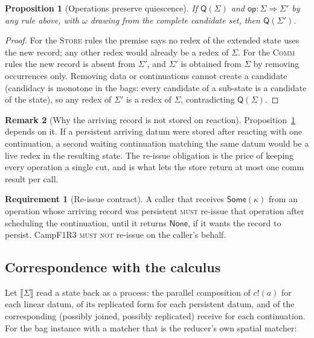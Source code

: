 \documentclass[11pt]{article}
\theoremstyle{plain}
\newtheorem{proposition}{Proposition}[section]
\theoremstyle{definition}
\newtheorem{requirement}{Requirement}
\newtheorem{remark}[proposition]{Remark}
\newcommand{\Camp}{CampF1R3}
\newcommand{\Qui}{\mathsf{Q}}
\newcommand{\MUST}{\textsc{must}}
\newcommand{\MUSTNOT}{\textsc{must not}}
\begin{document}
\begin{proposition}[Operations preserve quiescence]\label{prop:qui}
If $\Qui(\Sigma)$ and $\mathsf{op}:\Sigma\Longrightarrow\Sigma'$ by any rule above,
with $\omega$ drawing from the complete candidate set, then $\Qui(\Sigma')$.
\end{proposition}
\begin{proof}
For the \textsc{Store} rules the premise says no redex of the extended state uses
the new record; any other redex would already be a redex of $\Sigma$. For the
\textsc{Comm} rules the new record is absent from $\Sigma'$, and $\Sigma'$ is
obtained from $\Sigma$ by removing occurrences only. Removing data or
continuations cannot create a candidate (candidacy is monotone in the bags: every
candidate of a sub-state is a candidate of the state), so any redex of $\Sigma'$
is a redex of $\Sigma$, contradicting $\Qui(\Sigma)$.
\end{proof}

\begin{remark}[Why the arriving record is not stored on reaction]
Proposition~\ref{prop:qui} depends on it. If a persistent arriving datum were
stored after reacting with one continuation, a second waiting continuation matching
the same datum would be a live redex in the resulting state. The re-issue
obligation is the price of keeping every operation a single cut, and is what lets
the store return at most one comm result per call.
\end{remark}

\begin{requirement}[Re-issue contract]\label{req:reissue}
A caller that receives $\mathsf{Some}(\kappa)$ from an operation whose arriving
record was persistent \MUST{} re-issue that operation after scheduling the
continuation, until it returns $\mathsf{None}$, if it wants the record to
persist. \Camp{} \MUSTNOT{} re-issue on the caller's behalf.
\end{requirement}

\subsection{Correspondence with the calculus}

Let $\llbracket\Sigma\rrbracket$ read a state back as a process: the parallel
composition of $c!(a)$ for each linear datum, of its replicated form for each
persistent datum, and of the corresponding (possibly joined, possibly replicated)
receive for each continuation. For the bag instance with a matcher that is the
reducer's own spatial matcher:
\end{document}
